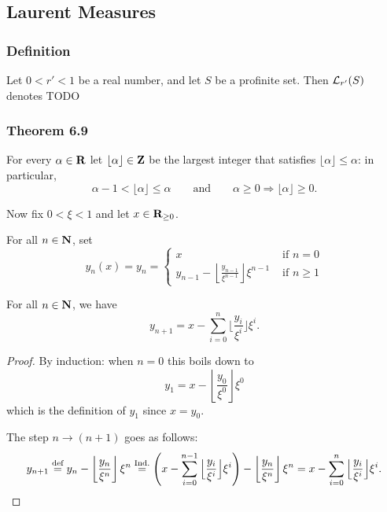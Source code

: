 \subsection{Laurent Measures}

\subsubsection{Definition}

\begin{definition}
  \label{laurent-measures}
  Let $0 < r' < 1$ be a real number, and let $S$ be a profinite set.
  Then $\mathcal L_{r'}(S)$ denotes TODO
\end{definition}

\subsubsection{Theorem 6.9}

For every $\alpha\in\mathbf{R}$ let $\lfloor \alpha\rfloor\in\mathbf{Z}$ be the largest integer that satisfies $\lfloor \alpha\rfloor\le \alpha$: in particular,
\[
  \alpha-1 < \lfloor \alpha\rfloor\le \alpha
  \qquad\text{and}\qquad
  \alpha\geq 0 \Longrightarrow \lfloor \alpha\rfloor \geq 0.
\]

Now fix $0< \xi<1$ and let $x\in\mathbf{R}_{\geq 0}$. 

\begin{definition}
  \label{theta.y}
  \leanok
	For all $n\in\mathbf{N}$, set
	\[
		y_n(x)=y_n=
		\begin{cases}
			x&\text{ if } n = 0 \\
			y_{n-1} - \left\lfloor \frac{y_{n-1}}{\xi^{n-1}} \right\rfloor \xi^{n-1} & \text{ if } n \ge 1
		\end{cases}
	\]
\end{definition}

\begin{lemma}
  \label{theta.finite_sum}
  \leanok
  For all $n\in\mathbf{N}$, we have
  \[
    y_{n+1} = x - \sum_{i=0}^n \Big\lfloor \frac{y_i}{\xi^i} \Big\rfloor \xi^i.
  \]
\end{lemma}

\begin{proof}
  \leanok
  By induction: when $n=0$ this boils down to
  \[
    y_1=x-\left\lfloor \frac{y_0}{\xi^0}\right\rfloor \xi^0
  \]
  which is the definition of $y_1$ since $x=y_0$.

	The step $n\to (n+1)$ goes as follows:
	\[
		y_{n+1} \overset{\text{def}}{=} y_{n} - \left\lfloor \frac{y_{n}}{\xi^{n}} \right\rfloor \xi^{n}
		\overset{\text{Ind.}}{=} \left(x - \sum_{i=0}^{n-1} \Big\lfloor \frac{y_i}{\xi^i} \Big\rfloor\xi^i\right) -
		\left\lfloor \frac{y_{n}}{\xi^{n}} \right\rfloor\xi^{n}
		= x - \sum_{i=0}^n \Big\lfloor \frac{y_i}{\xi^i} \Big\rfloor \xi^i.
		\qedhere
	\]
\end{proof}

